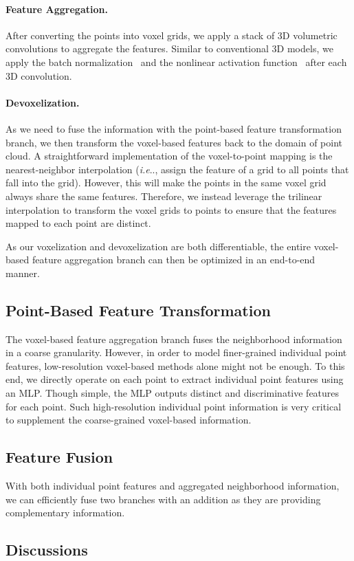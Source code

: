 \documentclass{article}
\makeatletter
\DeclareRobustCommand\onedot{\futurelet\@let@token\@onedot}
\def\@onedot{\ifx\@let@token.\else.\null\fi\xspace}
\def\ie{\emph{i.e}\onedot} \def\Ie{\emph{I.e}\onedot}
\newcommand{\myparagraph}[1]{\vspace{-6pt}\paragraph{#1}}
\makeatother
\begin{document}
\myparagraph{Feature Aggregation.}

After converting the points into voxel grids, we apply a stack of 3D volumetric convolutions to aggregate the features. Similar to conventional 3D models, we apply the batch normalization~\cite{Ioffe:2015bn} and the nonlinear activation function~\cite{Maas:2013re} after each 3D convolution.

\myparagraph{Devoxelization.}

As we need to fuse the information with the point-based feature transformation branch, we then transform the voxel-based features back to the domain of point cloud. A straightforward implementation of the voxel-to-point mapping is the nearest-neighbor interpolation (\ie, assign the feature of a grid to all points that fall into the grid). However, this will make the points in the same voxel grid always share the same features. Therefore, we instead leverage the trilinear interpolation to transform the voxel grids to points to ensure that the features mapped to each point are distinct.

As our voxelization and devoxelization are both differentiable, the entire voxel-based feature aggregation branch can then be optimized in an end-to-end manner.

\subsection{Point-Based Feature Transformation}

The voxel-based feature aggregation branch fuses the neighborhood information in a coarse granularity. However, in order to model finer-grained individual point features, low-resolution voxel-based methods alone might not be enough. To this end, we directly operate on each point to extract individual point features using an MLP. Though simple, the MLP outputs distinct and discriminative features for each point. Such high-resolution individual point information is very critical to supplement the coarse-grained voxel-based information. 

\subsection{Feature Fusion}

With both individual point features and aggregated neighborhood information, we can efficiently fuse two branches with an addition as they are providing complementary information.


\subsection{Discussions}
\end{document}

